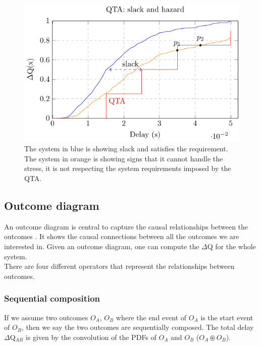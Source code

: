         \begin{figure}[H]
            \begin{center}
                \includegraphics[scale=1]{tikz/cdf_qta_slack.pdf}
            \end{center}
            \label{fig:qta_step}
            \caption{The system in blue is showing slack and satisfies the requirement. The system in orange is showing signs that it cannot handle the stress, it is not respecting the system requirements imposed by the QTA.}%
        \end{figure}

    \subsection{Outcome diagram}
        An outcome diagram is central to capture the causal relationships between the outcomes \cite{myo}. It shows the causal connections between all the outcomes we are interested in. Given an outcome diagram, one can compute the $\Delta$Q for the whole system. \\
        There are four different operators that represent the relationships between outcomes. 
    \subsubsection{Sequential composition}
        If we assume two outcomes $O_A$, $O_B$ where the end event of $O_A$ is the start event of $O_B$, then we say the two outcomes are sequentially composed. The total delay $\Delta$Q$_{AB}$ is given by the convolution of the PDFs of $O_A$ and $O_B$ ($O_A \circledast O_B$).
        
